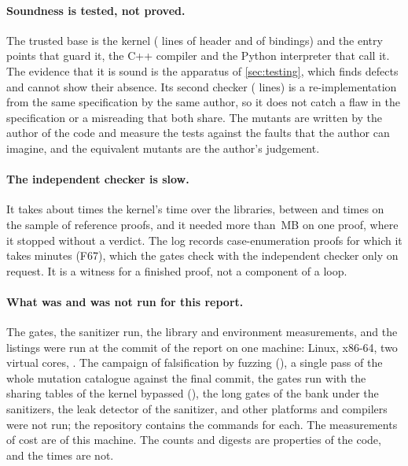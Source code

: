 \paragraph{Soundness is tested, not proved.}
The trusted base is the kernel (\locKernelHeader{} lines of header and \locBindings{} of bindings) and the entry points that guard it, the C++ compiler and the Python interpreter that call it.
The evidence that it is sound is the apparatus of \cref{sec:testing}, which finds defects and cannot show their absence.
Its second checker (\locchecker{} lines) is a re-implementation from the same specification by the same author, so it does not catch a flaw in the specification or a misreading that both share.
The mutants are written by the author of the code and measure the tests against the faults that the author can imagine, and the \mutEquiv{} equivalent mutants are the author's judgement.

\paragraph{The independent checker is slow.}
It takes about \indOverKernel{} times the kernel's time over the libraries, between \chkRatioMin{} and \chkRatioMax{} times on the sample of reference proofs, and it needed more than \chkCapMB\,MB on one proof, where it stopped without a verdict.
The log records case-enumeration proofs for which it takes minutes (F67), which the gates check with the independent checker only on request.
It is a witness for a finished proof, not a component of a loop.

\paragraph{What was and was not run for this report.}
The gates, the sanitizer run, the library and environment measurements, and the listings were run at the commit of the report on one machine: Linux, x86-64, two virtual cores, \mCompiler.
The campaign of falsification by fuzzing (), a single pass of the whole mutation catalogue against the final commit, the gates run with the sharing tables of the kernel bypassed (), the long gates of the bank under the sanitizers, the leak detector of the sanitizer, and other platforms and compilers were not run; the repository contains the commands for each.
The measurements of cost are of this machine.
The counts and digests are properties of the code, and the times are not.

